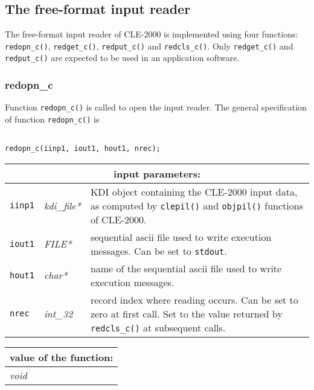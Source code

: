 \subsection {The free-format input reader}

The free-format input reader of CLE-2000 is implemented using four functions: {\tt redopn\_c()}, {\tt redget\_c()}, {\tt redput\_c()} and {\tt redcls\_c()}.
Only {\tt redget\_c()} and {\tt redput\_c()} are expected to be used in an application software.

\subsubsection{redopn\_c}

Function {\tt redopn\_c()} is called to open the input reader.
The general specification of function {\tt redopn\_c()} is

\begin{verbatim}

redopn_c(iinp1, iout1, hout1, nrec);
\end{verbatim}

\vskip 0.8cm

\noindent
\begin{tabular}{|p{1.5cm}|p{2cm}|p{11cm}|}
\hline
\multicolumn{3}{|c|}{\bf input parameters:} \\
\hline
{\tt iinp1} & {\it kdi\_file*} & KDI object containing the CLE-2000 input data, as computed  by {\tt clepil()} and {\tt objpil()} functions of CLE-2000.\\
\hline
{\tt iout1} & {\it FILE*} & sequential {\sc ascii} file used to write execution messages. Can be set to {\tt stdout}. \\
\hline
{\tt hout1} & {\it char*} & name of the sequential {\sc ascii} file used to write execution messages. \\
\hline
{\tt nrec} & {\it int\_32} & record index where reading occurs. Can be set to zero at first call. Set to the value returned by {\tt redcls\_c()} at subsequent calls.\\
\hline
\end{tabular}

\vskip 0.4cm

\noindent
\begin{tabular}{|p{4.0cm}|p{11cm}|}
\hline
\multicolumn{2}{|c|}{\bf value of the function:} \\
\hline
{\it void} &  \\
\hline
\end{tabular}

